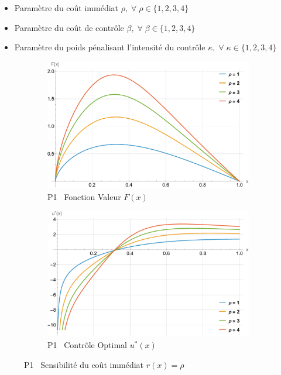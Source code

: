 \begin{itemize}
    \item Paramètre du coût immédiat $\rho,\;\forall\;\rho\in\{1,2,3,4\}$
    \item Paramètre du coût de contrôle $\beta,\;\forall\;\beta\in\{1,2,3,4\}$
    \item Paramètre du poids pénalisant l'intensité du contrôle $\kappa,\;\forall\;\kappa\in\{1,2,3,4\}$
\end{itemize}
\begin{figure}[htb]
    \centering
    \begin{subfigure}{0.45\linewidth}
        \includegraphics[width=\linewidth]{img/validation/P1/p1_R_value.pdf}
        \caption{P1 \textemdash~Fonction Valeur $F(x)$}\label{fig:RhoValueVisualisation1}
    \end{subfigure}
    \hfill
    \begin{subfigure}{0.45\linewidth}
        \includegraphics[width=\linewidth]{img/validation/P1/p1_R_control.pdf}
        \caption{P1 \textemdash~Contrôle Optimal $u^*(x)$}\label{fig:RhoControlVisualisation1}
    \end{subfigure}
    \caption{P1 \textemdash~Sensibilité du coût immédiat $r(x)=\rho$}\label{fig:RhoValueControlComparison1}
\end{figure}

